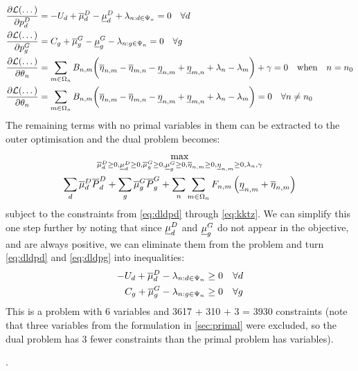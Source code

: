 \documentclass[11pt,a4paper]{article}
\numberwithin{equation}{section}
\begin{document}
\begin{align}
\frac{\partial \mathcal{L}(\dots) }{\partial p^D_d} &= - U_d + \overline{\mu}_d^D - \underline{\mu}_d^D + \lambda_{n:d \in \Psi_n} = 0 \quad \forall d \label{eq:dldpd} \\
\frac{\partial \mathcal{L}(\dots) }{\partial p^G_g} &= C_g + \overline{\mu}_g^G - \underline{\mu}_g^G - \lambda_{n:g \in \Psi_n} = 0 \quad \forall g \label{eq:dldpg}\\
\frac{\partial \mathcal{L}(\dots) }{\partial \theta_n} &= \sum_{m \in \Omega_n} B_{n,m} \biggl( 
\overline{\eta}_{n,m} - \overline{\eta}_{m,n} - \underline{\eta}_{n,m} + \underline{\eta}_{m,n} + \lambda_n - \lambda_m
\biggr) + \gamma = 0\quad \text{when} \quad n = n_0\\
\frac{\partial \mathcal{L}(\dots) }{\partial \theta_n} &= \sum_{m \in \Omega_n} B_{n,m} \biggl( 
\overline{\eta}_{n,m} - \overline{\eta}_{m,n} - \underline{\eta}_{n,m} + \underline{\eta}_{m,n} + \lambda_n - \lambda_m
\biggr) = 0 \quad \forall n \neq n_0 \label{eq:kktz}
\end{align}
The remaining terms with no primal variables in them can be extracted to the outer optimisation and the dual problem becomes:
\begin{multline}
\max_{\overline{\mu}_d^D \geq 0, \underline{\mu}_d^D \geq 0, \overline{\mu}_g^G \geq 0, \underline{\mu}_g^G \geq 0, \overline{\eta}_{n,m} \geq 0, \underline{\eta}_{n,m} \geq 0, \lambda_n, \gamma} \\
\sum_d \overline{\mu}_d^D \overline{P}^D_d + \sum_g \overline{\mu}_g^G \overline{P}^G_g 
+ \sum_n \sum_{m \in \Omega_n} F_{n,m} \left( \underline{\eta}_{n,m} + \overline{\eta}_{n,m} \right)
\end{multline}
subject to the constraints from \cref{eq:dldpd} through \cref{eq:kktz}.
We can simplify this one step further by noting that since $\underline{\mu}_d^D$ and $\underline{\mu}_g^G$ do not appear in the objective, and are always positive, we can eliminate them from the problem and turn \cref{eq:dldpd} and \cref{eq:dldpg} into inequalities:
\begin{align}
- U_d + \overline{\mu}_d^D - \lambda_{n:d \in \Psi_n} &\geq 0 \quad \forall d  \\
C_g + \overline{\mu}_g^G - \lambda_{n:g \in \Psi_n} &\geq 0 \quad \forall g
\end{align}
This is a problem with 6 variables and 3617 + 310 + 3 = 3930 constraints (note that three variables from the formulation in \cref{sec:primal} were excluded, so the dual problem has 3 fewer constraints than the primal problem has variables).


\renewcommand{\refname}{\section{References}}.

\end{document}
